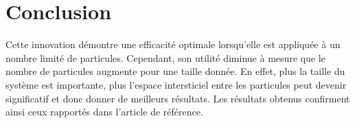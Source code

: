 \documentclass[11pt,a4paper]{article}
\begin{document}
\section{Conclusion}

Cette innovation démontre une efficacité optimale lorsqu'elle est appliquée à un nombre limité de particules. Cependant, son utilité diminue à mesure que le nombre de particules augmente pour une taille donnée. En effet, plus la taille du système est importante, plus l'espace intersticiel entre les particules peut devenir significatif et donc donner de meilleurs résultats.
Les résultats obtenus confirment ainsi ceux rapportés dans l'article de référence.
\end{document}

